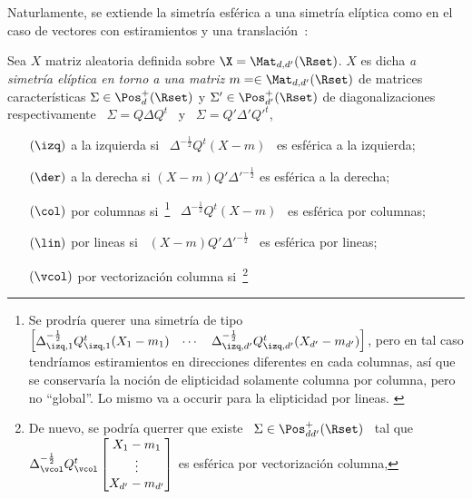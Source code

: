 Naturlamente, se  extiende la simetr\'ia esf\'erica a  una simetr\'ia el\'iptica
como en el  caso de vectores con estiramientos  y una translaci\'on~\cite{Mal61,
  Tyl82, Chm80, FraNg80, Kar81:1, Kar81, Kar89, JenGoo81, GupNag99, GupVar13}:
%
\begin{definicion}
%
  Sea $X$  matriz aleatoria  definida sobre $\X  = \Mat_{d,d'}(\Rset)$.   $X$ es
  dicha  {\em  a  simetr\'ia  el\'iptica  en   torno  a  una  matriz  $m  =  \in
    \Mat_{d,d'}(\Rset)$}    de    matrices    caracter\'isticas   $\Sigma    \in
  \Pos_d^+(\Rset)$  y  $\Sigma'  \in  \Pos_{d'}^+(\Rset)$  de  diagonalizaciones
  respectivamente \ $\Sigma = Q \Delta Q^t$ \ y \ $\Sigma = Q' \Delta' Q'^t$,
  \begin{itemize}
  \item[$(\izq)$]  a  la izquierda  si  \  $\Delta^{-\frac12}  Q^t (X-m)$  \  es
    esf\'erica a la izquierda;
  \item[$(\der)$] a la derecha si $(X-m) Q' \Delta'^{-\frac12} $ es esf\'erica a
    la derecha;
  \item[$(\col)$] por  columnas si~\footnote{Se prodr\'ia  querer una simetr\'ia
      de tipo $\begin{bmatrix} \Delta_{\izq,1}^{-\frac12} Q_{\izq,1}^t (X_1-m_1)
        &      \cdots      &      \Delta_{\izq,d'}^{-\frac12}      Q_{\izq,d'}^t
        (X_{d'}-m_{d'})   \end{bmatrix}$,   pero   en  tal   caso   tendr\'iamos
      estiramientos  en direcciones diferentes  en cada  columnas, as\'i  que se
      conservar\'ia la  noci\'on de  elipticidad solamente columna  por columna,
      pero  no  ``global''.  Lo  mismo  va a  occurir  para  la elipticidad  por
      lineas.   \label{Foot:MP:EDc}}  \   $\Delta^{-\frac12}  Q^t  (X-m)$  \  es
    esf\'erica por columnas;
  \item[$(\lin)$] por lineas si \  $(X-m) Q' \Delta'^{-\frac12}$ \ es esf\'erica
    por lineas;
  \item[$(\vcol)$]  por   vectorizaci\'on  columna  si~\footnote{De   nuevo,  se
      podr\'ia querrer que existe \ $\Sigma \in \Pos_{dd'}^+(\Rset)$ \ tal que \
      $\Delta_\vcol^{-\frac12}  Q_\vcol^t \begin{bmatrix}  X_1-m_1 \\  \vdots \\
        X_{d'}-m_{d'} \end{bmatrix}$ es  esf\'erica por vectorizaci\'on columna,
}
\end{itemize}
\end{definicion}
